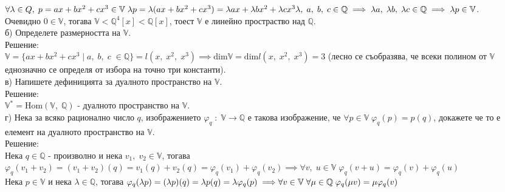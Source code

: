 \documentclass[12pt]{article}
\newcommand{\Q}{\mathbb{Q}}
\newcommand{\V}{\mathbb{V}}
\begin{document}
$\forall \lambda \in Q, \; p = ax + bx^2 + cx^3 \in \V \; \lambda p = \lambda(ax + bx^2 + cx^3) = \lambda a x + \lambda b x^2 + \lambda c x^3 \\\\
\lambda, \; a, \; b, \; c \in \Q \implies \lambda a, \; \lambda b, \; \lambda c \in \Q \implies \lambda p \in \V$. \\

Очевидно $0 \in \V$, тогава $\V < \Q^4[x] < \Q[x]$, тоест $\V$ е линейно простраство над $\Q$. \\

б) Определете размерността на $\V$. \\

Решение: \\

$\V = \{ax + bx^2 + cx^3 \; | \; a, \; b, \; c \; \in \Q \} = l(x, \; x^2, \; x^3) \implies \mathrm{dim}\V = \mathrm{dim}l(x, \; x^2, \; x^3) = 3$
(лесно се съобразява, че всеки полином от $\V$ еднозначно се определя от избора на точно три константи). \\

в) Напишете дефиницията за дуалното пространство на $\V$. \\

Решение: \\

$\V^* = \mathrm{Hom}(\V, \; \Q)$ - дуалното пространство на $\V$. \\

г) Нека за всяко рационално число $q$, изображението $\varphi_q \; : \; \V \to \Q$ е такова изображение,
че $\forall p \in \V \; \varphi_q(p) = p(q)$, докажете че то е елемент на дуалното пространство на $\V$. \\

Решение: \\

Нека $q \in \Q$ - произволно и нека $v_1, \; v_2 \in \V$, тогава \\

$\varphi_q(v_1 + v_2) = (v_1 + v_2)(q) = v_1(q) + v_2(q) = \varphi_q(v_1) + \varphi_q(v_2) \implies \forall v, \; u \in \V \; \varphi_q(v + u) = \varphi_q(v) + \varphi_q(u) $ \\

Нека $p \in \V$ и нека $\lambda \in \Q$, тогава $\varphi_q(\lambda p) = (\lambda p)(q) = \lambda p(q) = \lambda \varphi_q(p) \implies \\
\forall v \in \V \; \forall \mu \in \Q \; \varphi_q(\mu v) = \mu \varphi_q(v)$ \\
\end{document}
